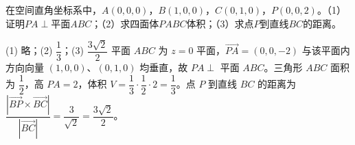 \begin{question}[GPT生成]
在空间直角坐标系中，$A(0,0,0)$，$B(1,0,0)$，$C(0,1,0)$，$P(0,0,2)$。（1）证明$PA\perp$平面$ABC$；（2）求四面体$PABC$体积；（3）求点$P$到直线$BC$的距离。
\end{question}
\solutionSpace{5cm}
\begin{answer}{(1) 略；(2) $\dfrac13$；(3) $\dfrac{3\sqrt2}{2}$}
平面 $ABC$ 为 $z=0$ 平面，$\overrightarrow{PA}=(0,0,-2)$ 与该平面内方向向量 $(1,0,0)$、$(0,1,0)$ 均垂直，故 $PA\perp$ 平面 $ABC$。三角形 $ABC$ 面积为 $\dfrac12$，高 $PA=2$，体积 $V=\dfrac13\cdot\dfrac12\cdot2=\dfrac13$。点 $P$ 到直线 $BC$ 的距离为 $\dfrac{|\overrightarrow{BP}\times\overrightarrow{BC}|}{|\overrightarrow{BC}|}=\dfrac3{\sqrt2}=\dfrac{3\sqrt2}{2}$。
\end{answer}

\printChapterAnswers

